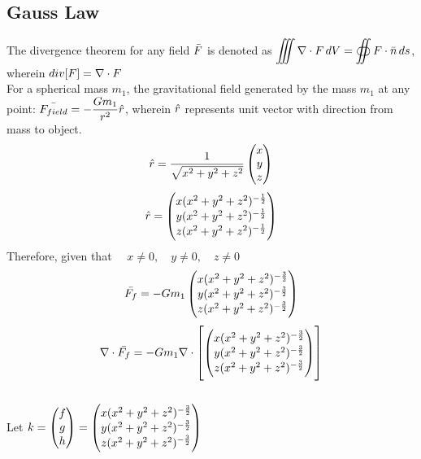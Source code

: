 \documentclass[class=report, 12pt, crop=false]{standalone}
\begin{document}
\begin{center}
\chapter{Gauss Law}
\begin{comment}
\end{comment}
\begin{comment}
\end{comment}
The divergence theorem for any field $\bar{F}$ is denoted as $\displaystyle{\iiint \nabla\cdot F \,dV =  \oiint {F \cdot\bar{n}}\,ds }$, wherein $div[F] = \nabla \cdot F$
\\For a spherical mass $m_1$, the gravitational field generated by the mass $m_1$ at any point: $\displaystyle{\bar{F_{field}} = -\frac{Gm_1}{r^2}\hat{r}}$, wherein $\hat{r}$ represents unit vector with direction from mass to object. 
$$\displaystyle{\hat{r} = \frac{1}{\sqrt{x^2 + y^2 + z^2}}\begin{pmatrix} x\\y\\z \end{pmatrix}}$$
$$\hat{r} = \begin{pmatrix} x(x^2+y^2+z^2)^{-\frac{1}{2}}\\y(x^2+y^2+z^2)^{-\frac{1}{2}} \\z(x^2+y^2+z^2)^{-\frac{1}{2}} \end{pmatrix}$$
Therefore, given that $\quad x \neq 0,\quad y \neq 0, \quad z \neq 0$
$$\bar{F_f} = -Gm_1\begin{pmatrix} x(x^2+y^2+z^2)^{-\frac{3}{2}}\\y(x^2+y^2+z^2)^{-\frac{3}{2}} \\z(x^2+y^2+z^2)^{-\frac{3}{2}} \end{pmatrix}$$
$$\nabla \cdot \bar{F_f} =-Gm_1\nabla \cdot \left[\begin{pmatrix} x(x^2+y^2+z^2)^{-\frac{3}{2}}\\y(x^2+y^2+z^2)^{-\frac{3}{2}} \\z(x^2+y^2+z^2)^{-\frac{3}{2}} \end{pmatrix}\right]$$
\\Let $\displaystyle{k =\begin{pmatrix} f\\g\\h\end{pmatrix}= \begin{pmatrix} x(x^2+y^2+z^2)^{-\frac{3}{2}}\\y(x^2+y^2+z^2)^{-\frac{3}{2}} \\z(x^2+y^2+z^2)^{-\frac{3}{2}} \end{pmatrix}}$

\end{center}
\end{document}
